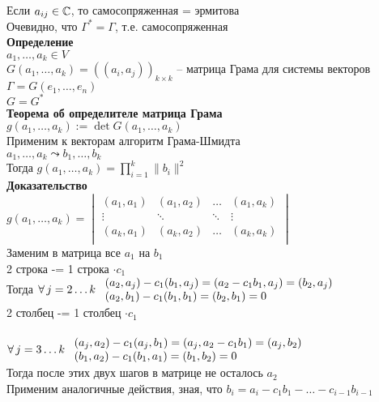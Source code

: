 \documentclass[12pt]{article}
\begin{document}
Если $a_{ij} \in \mathbb{C}$, то самосопряженная = эрмитова\\
Очевидно, что $\Gamma^* = \Gamma$, т.е. самосопряженная\\
\textbf{Определение}\\
$a_1, \ldots, a_k \in V$\\
$G(a_1,\ldots, a_k) = ((a_i, a_j))_{k\times k}$ -- матрица Грама для системы векторов\\
$\Gamma = G(e_1,\ldots, e_n)$\\
$G = G^*$\\
\textbf{Теорема об определителе матрица Грама}\\
$g(a_1, \ldots, a_k) := \det G(a_1,\ldots, a_k)$\\
Применим к векторам алгоритм Грама-Шмидта\\
$a_1, \ldots, a_k \leadsto b_1, \ldots, b_k$\\
Тогда $g(a_1, \ldots, a_k) = \prod_{i=1}^k \|b_i\|^2$\\
\textbf{Доказательство}\\
$g(a_1, \ldots, a_k) = \begin{vmatrix}
    (a_1, a_1) & (a_1, a_2) & \ldots & (a_1, a_k)\\
    \vdots & \ddots & \ddots & \vdots\\
    (a_k, a_1) & (a_k, a_2) & \ldots & (a_k, a_k)\\
\end{vmatrix}$\\
Заменим в матрица все $a_1$ на $b_1$\\
2 строка -= 1 строка $\cdot c_1$\\
Тогда $\forall\, j = 2\ldots k\ \begin{array}{ll}
    (a_2, a_j) - c_1 (b_1, a_j) = (a_2-c_1b_1, a_j) = (b_2, a_j)\\
    (a_2, b_1) - c_1(b_1,b_1) = (b_2, b_1) = 0
\end{array}$\\
2 столбец -= 1 столбец $\cdot c_1$\\\\
$\forall\, j=3\ldots k\ \begin{array}{ll}
    (a_j, a_2) - c_1(a_j, b_1) = (a_j, a_2 - c_1 b_1) = (a_j, b_2)\\
    (b_1, a_2) - c_1(b_1, a_1) = (b_1, b_2) = 0
\end{array}$\\
Тогда после этих двух шагов в матрице не осталось $a_2$\\
Применим аналогичные действия, зная, что $b_i = a_i - c_1 b_1 - \ldots - c_{i-1}b_{i-1}$\\
\end{document}
